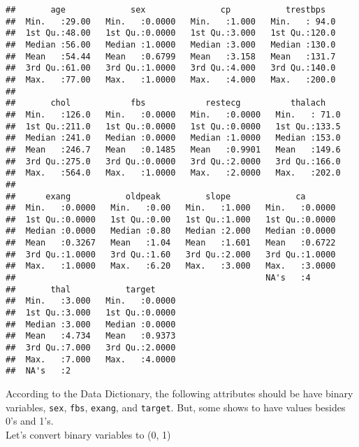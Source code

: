 \documentclass[
]{article}
\begin{document}
\begin{verbatim}
##       age             sex               cp           trestbps    
##  Min.   :29.00   Min.   :0.0000   Min.   :1.000   Min.   : 94.0  
##  1st Qu.:48.00   1st Qu.:0.0000   1st Qu.:3.000   1st Qu.:120.0  
##  Median :56.00   Median :1.0000   Median :3.000   Median :130.0  
##  Mean   :54.44   Mean   :0.6799   Mean   :3.158   Mean   :131.7  
##  3rd Qu.:61.00   3rd Qu.:1.0000   3rd Qu.:4.000   3rd Qu.:140.0  
##  Max.   :77.00   Max.   :1.0000   Max.   :4.000   Max.   :200.0  
##                                                                  
##       chol            fbs            restecg          thalach     
##  Min.   :126.0   Min.   :0.0000   Min.   :0.0000   Min.   : 71.0  
##  1st Qu.:211.0   1st Qu.:0.0000   1st Qu.:0.0000   1st Qu.:133.5  
##  Median :241.0   Median :0.0000   Median :1.0000   Median :153.0  
##  Mean   :246.7   Mean   :0.1485   Mean   :0.9901   Mean   :149.6  
##  3rd Qu.:275.0   3rd Qu.:0.0000   3rd Qu.:2.0000   3rd Qu.:166.0  
##  Max.   :564.0   Max.   :1.0000   Max.   :2.0000   Max.   :202.0  
##                                                                   
##      exang           oldpeak         slope             ca        
##  Min.   :0.0000   Min.   :0.00   Min.   :1.000   Min.   :0.0000  
##  1st Qu.:0.0000   1st Qu.:0.00   1st Qu.:1.000   1st Qu.:0.0000  
##  Median :0.0000   Median :0.80   Median :2.000   Median :0.0000  
##  Mean   :0.3267   Mean   :1.04   Mean   :1.601   Mean   :0.6722  
##  3rd Qu.:1.0000   3rd Qu.:1.60   3rd Qu.:2.000   3rd Qu.:1.0000  
##  Max.   :1.0000   Max.   :6.20   Max.   :3.000   Max.   :3.0000  
##                                                  NA's   :4       
##       thal           target      
##  Min.   :3.000   Min.   :0.0000  
##  1st Qu.:3.000   1st Qu.:0.0000  
##  Median :3.000   Median :0.0000  
##  Mean   :4.734   Mean   :0.9373  
##  3rd Qu.:7.000   3rd Qu.:2.0000  
##  Max.   :7.000   Max.   :4.0000  
##  NA's   :2
\end{verbatim}

According to the Data Dictionary, the following attributes should be
have binary variables, \texttt{sex}, \texttt{fbs}, \texttt{exang}, and
\texttt{target}. But, some shows to have values besides 0's and 1's.\\
Let's convert binary variables to (0, 1)
\end{document}
